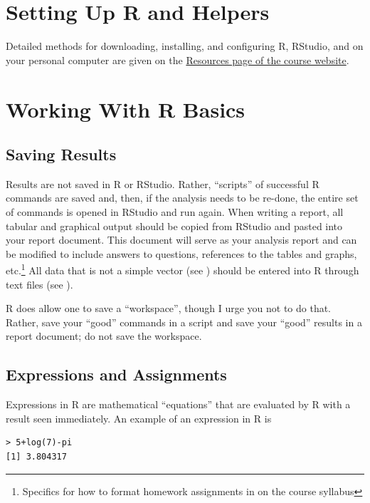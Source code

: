 \documentclass[10pt,openany]{book}\usepackage[]{graphicx}\usepackage[]{color}
\makeatletter
\newenvironment{kframe}{%
 \def\at@end@of@kframe{}%
 \ifinner\ifhmode%
  \def\at@end@of@kframe{\end{minipage}}%
  \begin{minipage}{\columnwidth}%
 \fi\fi%
 \def\FrameCommand##1{\hskip\@totalleftmargin \hskip-\fboxsep
 \colorbox{shadecolor}{##1}\hskip-\fboxsep
     \hskip-\linewidth \hskip-\@totalleftmargin \hskip\columnwidth}%
 \MakeFramed {\advance\hsize-\width
   \@totalleftmargin\z@ \linewidth\hsize
   \@setminipage}}%
 {\par\unskip\endMakeFramed%
 \at@end@of@kframe}
\newenvironment{knitrout}{}{} %
\makeatother
\begin{document}
\minitoc
\newpage

\section{Setting Up R and Helpers} \label{sect:RSetup}
\vspace{-8pt}
Detailed methods for downloading, installing, and configuring R, RStudio, and  on your personal computer are given on the \href{http://derekogle.com/NCMTH107/resources/}{Resources page of the course website}.

\vspace{-8pt}
\section{Working With R Basics} \label{sect:RBasics}
\vspace{-12pt}
\subsection{Saving Results} \label{sect:RSaving}
Results are not saved in R or RStudio.  Rather, ``scripts'' of successful R commands are saved and, then, if the analysis needs to be re-done, the entire set of commands is opened in RStudio and run again.  When writing a report, all tabular and graphical output should be copied from RStudio and pasted into your report document.  This document will serve as your analysis report and can be modified to include answers to questions, references to the tables and graphs, etc.\footnote{Specifics for how to format homework assignments in on the course syllabus}  All data that is not a simple vector (see ) should be entered into R through text files (see ).

R does allow one to save a ``workspace'', though I urge you not to do that.  Rather, save your ``good'' commands in a script and save your ``good'' results in a report document; do not save the workspace.


\vspace{-8pt}
\subsection{Expressions and Assignments} \label{sect:RExprAssn}
\vspace{-8pt}
Expressions in R are mathematical ``equations'' that are evaluated by R with a result seen immediately.  An example of an expression in R is
\begin{knitrout}
\color{fgcolor}\begin{kframe}
\begin{verbatim}
> 5+log(7)-pi
[1] 3.804317
\end{verbatim}
\end{kframe}
\end{knitrout}
\end{document}
